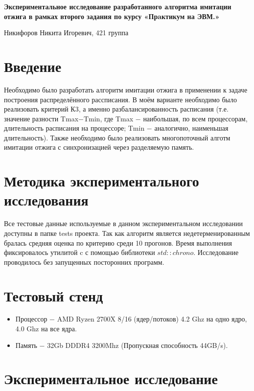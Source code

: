 \documentclass[a4peper, 12pt, titlepage, finall]{extreport}
\begin{document}
\begin{center}
    {\large \bf Экспериментальное исследование разработанного алгоритма имитации отжига в рамках второго задания по курсу 
    «Прaктикум на ЭВМ.»}

\end{center}
        \begin{flushright}
            {Никифоров Никита Игоревич, 421 группа}\\
        \end{flushright}
    \section{Введение}
        Необходимо было разработать алгоритм имитации отжига в применении к задаче построения распределённого рассписания. 
        В моём варианте необходимо было реализовать критерий К3, а именно разбалансированность расписания 
        (т.е. значение разности Tmax$-$Tmin, где Tmax $-$ наибольшая, по всем процессорам, длительность расписания на процессоре; Tmin $-$ аналогично, наименьшая длительность).
        Также необходимо было реализовать многопоточный алготм имитации отжига с синхронизацией через разделяемую память.
    
    \section{Методика экспериментального исследования}
        Все тестовые данные используемые в данном экспериментальном исследовании доступны в папке tests проекта. 
        Так как алгоритм является недетерменированным бралась средняя оценка по критерию среди 10 прогонов. 
        Время выполнения фиксировалось утилитой c с помощью библиотеки $std::chrono$.
        Исследование проводилось без запущенных посторонних программ.
    
    \section{Тестовый стенд}
        \begin{itemize}
            \item Процессор $-$ AMD Ryzen 2700X 8/16 (ядер/потоков) 4.2 Ghz на одно ядро, 4.0 Ghz на все ядра.
            \item Память $-$ 32Gb DDDR4 3200Mhz (Пропускная способность 44GB/s).
        \end{itemize}

    \section{Экспериментальное исследование}
\end{document}

